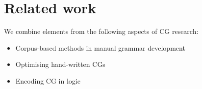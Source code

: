 







\section{Related work}
\label{sec:prev}


We combine elements from the following aspects of CG research:

\begin{itemize}
\item Corpus-based methods in manual grammar development \cite{voutilainen2004}
\item Optimising hand-written CGs~\cite{bick2013tuning}
\item Encoding CG in logic \cite{lager98,lager_nivre01,listenmaa_claessen2015}
\end{itemize}

